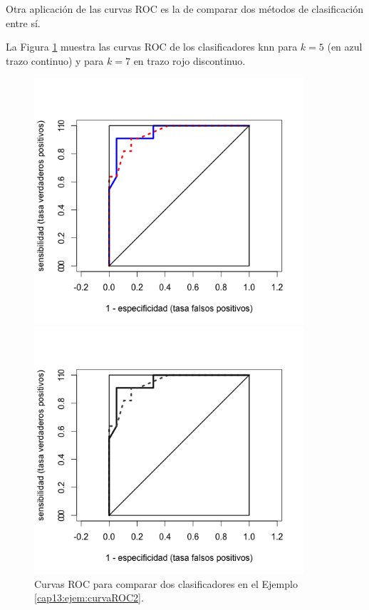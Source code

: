 Otra aplicación de las curvas ROC es la de comparar dos métodos de clasificación entre sí.
\begin{ejemplo}
\label{cap13:ejem:CurvasROCcompararClasificadores}
La Figura \ref{cap13:fig:curvaROCdosmodelos} muestra las curvas ROC de los clasificadores knn para $k=5$ (en azul trazo continuo) y para $k=7$ en trazo rojo discontinuo.

\begin{figure}[htb]
\begin{center}
\begin{enColor}
\includegraphics[width=10cm]{../fig/Cap13-CurvaROCvasculopatia02.png}
\end{enColor}
\begin{bn}
\includegraphics[width=10cm]{../fig/Cap13-CurvaROCvasculopatia02-bn.png}
\end{bn}
\caption{Curvas ROC  para comparar dos clasificadores en el Ejemplo  \ref{cap13:ejem:curvaROC2}. }
\label{cap13:fig:curvaROCdosmodelos}
\end{center}
\end{figure}



\end{ejemplo}

